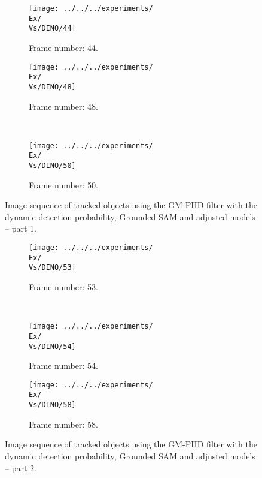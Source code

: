 \begin{figure}[H]
    \centering
    \begin{subfigure}{\textwidth}
        \centering
        \texttt{[image: ../../../experiments/\\Ex/\\Vs/DINO/44]}
        \caption{Frame number: 44.}
        \label{fig:\Ex-\Vs-\Set:01}
    \end{subfigure}
    \begin{subfigure}{\textwidth}
        \centering
        \texttt{[image: ../../../experiments/\\Ex/\\Vs/DINO/48]}
        \caption{Frame number: 48.}
        \label{fig:\Ex-\Vs-\Set:02}
    \end{subfigure}
    \\
    \begin{subfigure}{\textwidth}
        \centering
        \texttt{[image: ../../../experiments/\\Ex/\\Vs/DINO/50]}
        \caption{Frame number: 50.}
        \label{fig:\Ex-\Vs-\Set:03}
    \end{subfigure}
    \caption{Image sequence of tracked objects using the GM-PHD filter with the dynamic detection probability, Grounded SAM and adjusted models -- part 1.}
    \label{fig:\Ex-\Vs-\Set_1}
\end{figure}
\begin{figure}[H]

    \begin{subfigure}{\textwidth}
        \centering
        \texttt{[image: ../../../experiments/\\Ex/\\Vs/DINO/53]}
        \caption{Frame number: 53.}
        \label{fig:\Ex-\Vs-\Set:04}
    \end{subfigure}
    \\
    \begin{subfigure}{\textwidth}
        \centering
        \texttt{[image: ../../../experiments/\\Ex/\\Vs/DINO/54]}
        \caption{Frame number: 54.}
        \label{fig:\Ex-\Vs-\Set:05}
    \end{subfigure}
    \begin{subfigure}{\textwidth}
        \centering
        \texttt{[image: ../../../experiments/\\Ex/\\Vs/DINO/58]}
        \caption{Frame number: 58.}
        \label{fig:\Ex-\Vs-\Set:06}
    \end{subfigure}
    \caption{Image sequence of tracked objects using the GM-PHD filter with the dynamic detection probability, Grounded SAM and adjusted models -- part 2.}
    \label{fig:\Ex-\Vs-\Set_2}
\end{figure}


